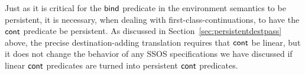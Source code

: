 Just as it is critical for the ${\sf bind}$ predicate in the
environment semantics to be persistent, it is necessary, when dealing
with first-class-continuations, to have the ${\sf cont}$ predicate be
persistent. As discussed in Section~\ref{sec:persistentdestpass}
above, the precise destination-adding translation requires that ${\sf
  cont}$ be linear, but it does not change the behavior of any SSOS
specifications we have discussed if linear ${\sf cont}$ predicates are
turned into persistent ${\sf cont}$ predicates.
